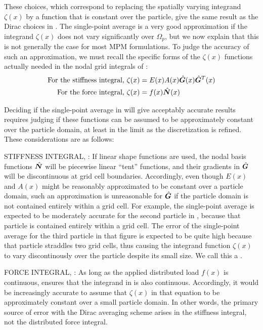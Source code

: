 These choices, which correspond to replacing the spatially varying integrand $\zeta(x)$ by a function that is constant over the particle, give the same result as the Dirac choices in .  The single-point average is a very good approximation if the integrand $\zeta(x)$ does not vary significantly over $\Omega_p$, but we now explain that this is not generally the case for most MPM formulations.  To judge the accuracy of such an approximation, we must recall the specific forms of the $\zeta(x)$ functions actually needed in the nodal grid integrals of
:
\begin{subequations}
\begin{align}
 \text{For the stiffness integral, } & \zeta(x)=E(x)A(x)\hat{\bm{G}}(x)\hat{\bm{G}}^T(x)
\label{eq:kintegrand}
\\
 \text{For the force integral, } & \zeta(x)=f(x)\hat{\bm{N}}(x)
\label{eq:fintegrand}
\end{align}
\label{none}
\end{subequations}

Deciding if the single-point average in  will give acceptably accurate results requires judging if these functions can be assumed to be approximately constant over the particle domain, at least in the limit as the discretization is refined. These considerations are as follows:
\begin{list}{}{}
\item STIFFNESS INTEGRAL, :  If linear shape functions are used, the nodal basis functions $\hat{\bm{N}}$ will be piecewise linear ``tent'' functions, and their gradients in $\hat{\bm{G}}$ will be discontinuous at grid cell boundaries.  Accordingly, even though $E(x)$ and $A(x)$ might be reasonably approximated to be constant over a particle domain, such an approximation is unreasonable for $\hat{\bm{G}}$ if the particle domain is not contained entirely within a grid cell. For example, the single-point average is expected to be moderately accurate for the second particle in , because that particle is contained entirely within a grid cell. The error of the single-point average for the third particle in that figure is expected to be quite high because that particle straddles two grid cells, thus causing the integrand function $\zeta(x)$ to vary discontinously over the particle despite its small size. We call this a .
\item FORCE INTEGRAL,  : As long as the applied distributed load $f(x)$ is continuous,  ensures that the integrand in  is also continuous. Accordingly, it would be increasingly accurate to assume that $\zeta(x)$ in that equation to be approximately constant over a small particle domain. In other words, the primary source of error with the Dirac averaging scheme arises in the stiffness integral, not the distributed force integral.
\end{list}


